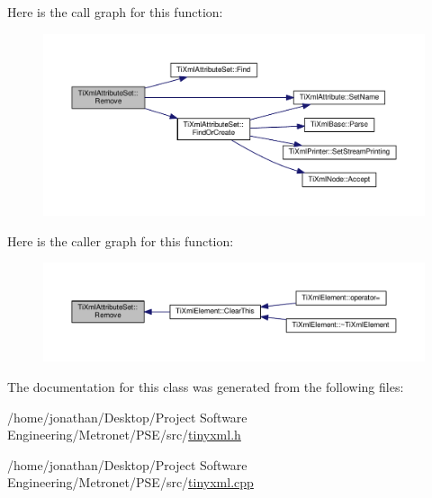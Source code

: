 Here is the call graph for this function\+:\nopagebreak
\begin{figure}[H]
\begin{center}
\leavevmode
\includegraphics[width=350pt]{class_ti_xml_attribute_set_a924a73d071f2573f9060f0be57879c57_cgraph}
\end{center}
\end{figure}




Here is the caller graph for this function\+:\nopagebreak
\begin{figure}[H]
\begin{center}
\leavevmode
\includegraphics[width=350pt]{class_ti_xml_attribute_set_a924a73d071f2573f9060f0be57879c57_icgraph}
\end{center}
\end{figure}




The documentation for this class was generated from the following files\+:\begin{DoxyCompactItemize}
\item 
/home/jonathan/\+Desktop/\+Project Software Engineering/\+Metronet/\+P\+S\+E/src/\hyperlink{tinyxml_8h}{tinyxml.\+h}\item 
/home/jonathan/\+Desktop/\+Project Software Engineering/\+Metronet/\+P\+S\+E/src/\hyperlink{tinyxml_8cpp}{tinyxml.\+cpp}\end{DoxyCompactItemize}
